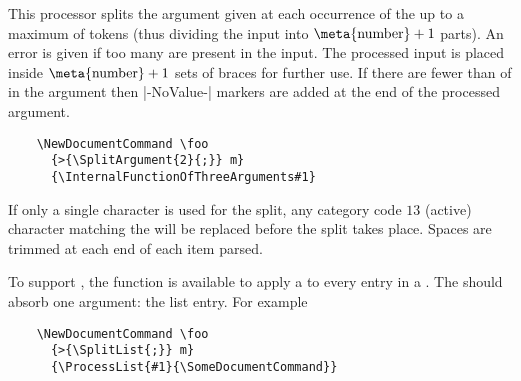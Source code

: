 \documentclass{l3doc}
\begin{document}
\begin{function}{\SplitArgument}
  \begin{syntax}
      
  \end{syntax}
  This processor splits the argument given at each occurrence of the
   up to a maximum of  tokens (thus
  dividing the input into $\text{\meta{number}} + 1$ parts).
  An error is given if too many  are present in the
  input. The processed input is placed inside
  $\text{\meta{number}} + 1$ sets of braces for further use.
  If there are fewer than  of  in the argument
  then |-NoValue-| markers are added at the end of the processed
  argument.
  \begin{verbatim}
    \NewDocumentCommand \foo
      {>{\SplitArgument{2}{;}} m}
      {\InternalFunctionOfThreeArguments#1}
   \end{verbatim}
   If only a single character  is used for the split, any
   category code $13$ (active) character matching the  will
   be replaced before the split takes place.
   Spaces are trimmed at each end of each item parsed.
 \end{function}


\begin{function}[EXP]{\ProcessList}
  \begin{syntax}
      
  \end{syntax}
  To support , the function  is available
  to apply a  to every entry in a . The
   should absorb one argument: the list entry. For example
  \begin{verbatim}
    \NewDocumentCommand \foo
      {>{\SplitList{;}} m}
      {\ProcessList{#1}{\SomeDocumentCommand}}
  \end{verbatim}
\end{function}
\end{document}
